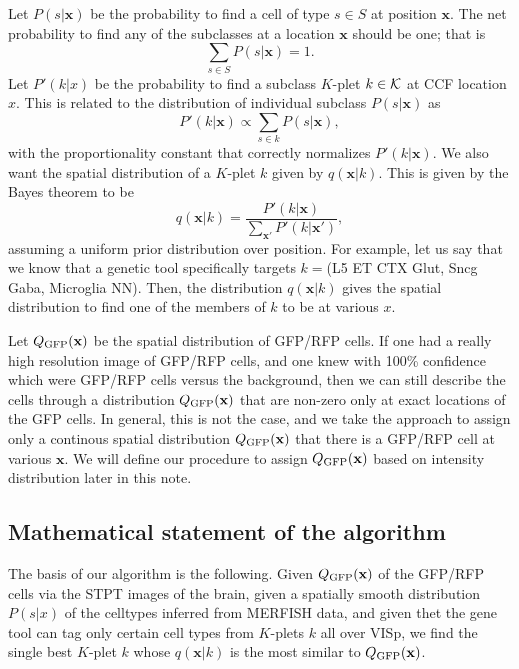 \documentclass{article}
\newcommand\beq{\begin{equation}}
\newcommand\eeq[1]{\label{#1}\end{equation}}
\begin{document}
Let $P(s|\mathbf{x})$ be the probability to find a cell of type $s\in S$
at position $\mathbf{x}$. 
The net probability to find any of the subclasses at a location $\mathbf{x}$ should be one; that is
\beq
\sum_{s\in S} P(s|\mathbf{x}) = 1.
\eeq{norms}
Let $P'(k|x)$ be the
probability to find a subclass $K$-plet $k \in {\cal K}$ at CCF location $x$.  This is
related to the distribution of individual subclass $P(s|\mathbf{x})$ as
\beq
P'(k|\mathbf{x}) \propto \sum_{s\in k} P(s|\mathbf{x}),
\eeq{kdist}
with the proportionality constant that correctly normalizes $P'(k|\mathbf{x})$. We also want
the spatial distribution of a $K$-plet $k$ given by $q(\mathbf{x}|k)$. This is given by the Bayes theorem to be 
\beq
q(\mathbf{x}|k) = \frac{P'(k|\mathbf{x})}{\sum_{\mathbf{x}'} P'(k|\mathbf{x}') },
\eeq{bayes}
assuming a uniform prior distribution over position. For example, let us say that we know that a 
genetic tool specifically targets $k=$(L5 ET CTX Glut, Sncg Gaba, Microglia NN).  Then, the 
distribution $q(\mathbf{x}|k)$ gives the spatial distribution to find one of the members of $k$ 
to be at various $x$.

Let $Q_{\rm GFP}(\mathbf{x})$ be the spatial distribution of GFP/RFP cells. If one had a really high resolution
image of GFP/RFP cells, and one knew with 100\% confidence which were GFP/RFP cells versus the background, 
then we can still describe the cells through a distribution $Q_{\rm GFP}(\mathbf{x})$ that are non-zero only 
at exact locations of the GFP cells. In general, this is not the case, and we take the approach to assign 
only a continous spatial distribution $Q_{\rm GFP}(\mathbf{x})$ that there is a GFP/RFP cell at various $\mathbf{x}$.
We will define our procedure to assign $Q_{\rm GFP}(\mathbf{x})$ based on intensity distribution later in this note.

\subsection{Mathematical statement of the algorithm}
The basis of our algorithm is the following.  Given $Q_{\rm GFP}(\mathbf{x})$ of the GFP/RFP cells via the STPT images 
of the brain, given a spatially smooth distribution $P(s|x)$ of the celltypes inferred from MERFISH data, and 
given thet the gene tool can tag only certain cell types from $K$-plets $k$ all over VISp, we find the single best $K$-plet $k$ 
whose $q(\mathbf{x}|k)$ is the most similar to $Q_{\rm GFP}(\mathbf{x})$.
\end{document}
